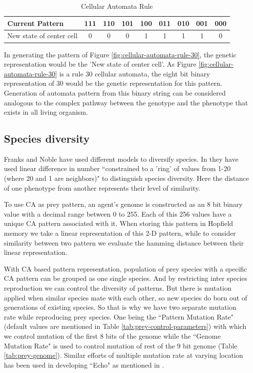\begin{table}[H]
	\centering
	\begin{tabular}{| l | c | c | c | c | c | c | c | c |}
	  \hline
	  Current Pattern & 111 & 110 & 101 & 100 & 011 & 010 & 001 & 000 \\ \hline
	  New state of center cell & 0 & 0 & 0 & 1 & 1 & 1 & 1 & 0 \\
	  \hline
	\end{tabular}
	\caption{Cellular Automata Rule}
	\label{tab:cellular-automata-rule}
\end{table}

In generating the pattern of Figure \ref{fig:cellular-automata-rule-30}, the genetic representation would be the 'New state of center cell'. As Figure \ref{fig:cellular-automata-rule-30} is a rule 30 cellular automata, the eight bit binary representation of 30 would be the genetic representation for this pattern. Generation of automata pattern from this binary string can be considered analogous to the complex pathway between the genotype and the phenotype that exists in all living organism.

\subsection{Species diversity}
Franks and Noble have used different models to diversify species. In \cite{franks2002} they have used linear difference in number ``constrained to a 'ring' of values  from 1-20 (where 20 and 1 are neighbors)" to distinguish species diversity. Here the distance of one phenotype from another represents their level of similarity. 

To use CA as prey pattern, an agent's genome is constructed as an 8 bit binary value with a decimal range between 0 to 255. Each of this 256 values have a unique CA pattern associated with it. When storing this pattern in Hopfield memory we take a linear representation of this 2-D pattern, while to consider similarity between two pattern we evaluate the hamming distance between their linear representation. 

With CA based pattern representation, population of prey species with a specific CA pattern can be grouped as one single species. And by restricting inter species reproduction we can control the diversity of patterns. But there is mutation applied when similar species mate with each other, so new species do born out of generations of existing species. So that is why we have two separate mutation rate while reproducing prey species. One being the ``Pattern Mutation Rate" (default values are mentioned in Table \ref{tab:prey-control-parameters}) with which we control mutation of the first 8 bits of the genome while the ``Genome Mutation Rate" is used to control mutation of rest of the 9 bit genome (Table \ref{tab:prey-genome}). Similar efforts of multiple mutation rate at varying location has been used in developing ``Echo" as mentioned in \cite{hraber1997}.

